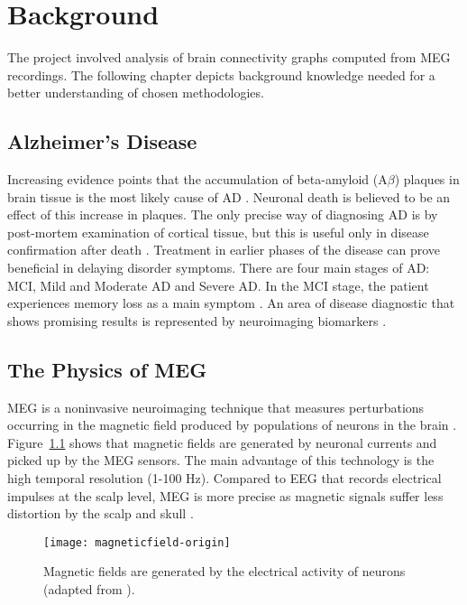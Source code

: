 \chapter{Background}
	The project involved analysis of brain connectivity graphs computed from \ac{MEG} recordings. The following chapter depicts background knowledge needed for a better understanding of chosen methodologies.

	\section{Alzheimer's Disease}
	Increasing evidence points that the accumulation of beta-amyloid (A\(\beta\)) plaques in brain tissue is the most likely cause of \ac{AD} \autocite{Cummings2004}. Neuronal death is believed to be an effect of this increase in plaques. The only precise way of diagnosing \ac{AD} is by post-mortem examination of cortical tissue, but this is useful only in disease confirmation after death \autocite{Khachaturian1985}. Treatment in earlier phases of the disease can prove beneficial in delaying disorder symptoms. There are four main stages of \ac{AD}: \ac{MCI}, Mild and Moderate \ac{AD} and Severe \ac{AD}. In the \ac{MCI} stage, the patient experiences memory loss as a main symptom \autocite{Morris2001}. An area of disease diagnostic that shows promising results is represented by neuroimaging biomarkers \autocite{Weiner2013,Filippi2011,Sperling2011}. 


	\section{The Physics of \ac{MEG}}
		\ac{MEG} is a noninvasive neuroimaging technique that measures perturbations occurring in the magnetic field produced by populations of neurons in the brain \autocite{LopesdaSilva2013}. Figure~\ref{fig:MEGsignal} shows that magnetic fields are generated by neuronal currents and picked up by the \ac{MEG} sensors. The main advantage of this technology is the high temporal resolution (1-100 Hz). Compared to \ac{EEG} that records electrical impulses at the scalp level, \ac{MEG} is more precise as magnetic signals suffer less distortion by the scalp and skull \autocite{LopesdaSilva2013}. 

		\begin{figure}
		    \centering
		    \texttt{[image: magneticfield-origin]}
		    \caption{Magnetic fields are generated by the electrical activity of neurons (adapted from \textcite{Washington}).}
		    \label{fig:MEGsignal}
		\end{figure}

